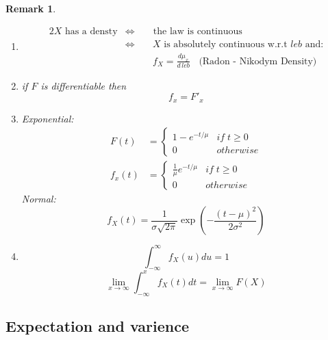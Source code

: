 \documentclass[12pt]{article}
\newtheorem*{remark}{Remark}
\begin{document}
\begin{remark} \quad \\
\begin{enumerate}[(1)]

\item \begin{alignat*}{2} X \text{ has a densty}  &\Leftrightarrow & &\text{ the law is continuous}\\
&\Leftrightarrow & & \; X \text{ is absolutely continuous w.r.t $leb$ and:} \\ & & & \; f_X = \frac{d\mu_x}{d\, leb}\; \; \text{     (Radon - Nikodym Density)} \end{alignat*}
\item if $F$ is differentiable then \[f_x = F'_x\]
\item Exponential: \begin{align*} F(t) &= \begin{cases}
1-e^{ - t/\mu} &if \;  t\geq 0\\
0 & otherwise \end{cases} \\
f_x(t) &= \begin{cases}
\frac{1}{\mu}e^{- t/\mu} &if \;  t\geq 0\\
0 & otherwise \end{cases} \end{align*} 
Normal:
\[f_X(t) = \frac{1}{\sigma \sqrt{2\pi}}\exp(- \frac{(t-\mu)^2}{2 \sigma^2})\]
\item \[\int_{-\infty}^{\infty}f_X(u)du = 1\]
\[ \lim_{x \rightarrow \infty}\int_{-\infty}^{x}f_X(t)dt = \lim_{x \rightarrow \infty}F(X)\]
\end{enumerate}
\end{remark}

\subsection{Expectation and varience}
\end{document}
